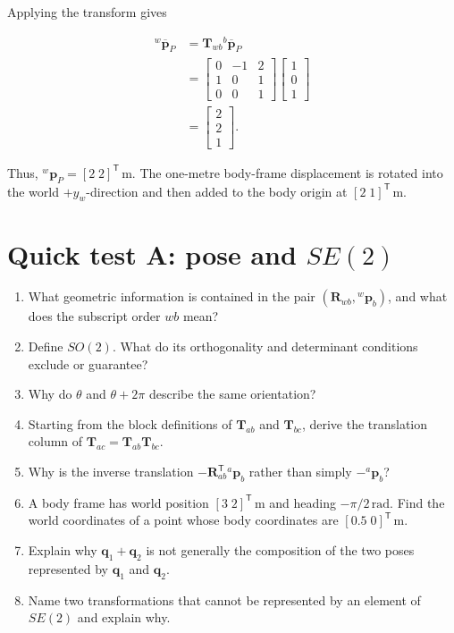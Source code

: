 \documentclass[
  australian,
  12pt,
  letterpaper,
  DIV=11,
  numbers=noendperiod,
  twoside]{scrreprt}
\providecommand{\tightlist}{%
  \setlength{\itemsep}{0pt}\setlength{\parskip}{0pt}}
\begin{document}
Applying the transform gives

\[
\begin{aligned}
{}^{w}\overline{\mathbf p}_P
&=
\mathbf T_{wb}{}^{b}\overline{\mathbf p}_P\\
&=
\begin{bmatrix}
0&-1&2\\
1&0&1\\
0&0&1
\end{bmatrix}
\begin{bmatrix}
1\\0\\1
\end{bmatrix}\\
&=
\begin{bmatrix}
2\\2\\1
\end{bmatrix}.
\end{aligned}
\]

Thus, \({}^{w}\mathbf p_P=[2\;2]^\mathsf T\,\mathrm m\). The one-metre
body-frame displacement is rotated into the world \(+y_w\)-direction and
then added to the body origin at \([2\;1]^\mathsf T\,\mathrm m\).

\section*{\texorpdfstring{Quick test A: pose and
\(SE(2)\)}{Quick test A: pose and SE(2)}}\label{quick-test-a-pose-and-se2}


\begin{enumerate}
\def\labelenumi{\arabic{enumi}.}
\tightlist
\item
  What geometric information is contained in the pair
  \((\mathbf R_{wb},{}^{w}\mathbf p_b)\), and what does the subscript
  order \(wb\) mean?
\item
  Define \(SO(2)\). What do its orthogonality and determinant conditions
  exclude or guarantee?
\item
  Why do \(\theta\) and \(\theta+2\pi\) describe the same orientation?
\item
  Starting from the block definitions of \(\mathbf T_{ab}\) and
  \(\mathbf T_{bc}\), derive the translation column of
  \(\mathbf T_{ac}=\mathbf T_{ab}\mathbf T_{bc}\).
\item
  Why is the inverse translation
  \(-\mathbf R_{ab}^\mathsf T{}^{a}\mathbf p_b\) rather than simply
  \(-{}^{a}\mathbf p_b\)?
\item
  A body frame has world position \([3\;2]^\mathsf T\,\mathrm m\) and
  heading \(-\pi/2\,\mathrm{rad}\). Find the world coordinates of a
  point whose body coordinates are \([0.5\;0]^\mathsf T\,\mathrm m\).
\item
  Explain why \(\mathbf q_1+\mathbf q_2\) is not generally the
  composition of the two poses represented by \(\mathbf q_1\) and
  \(\mathbf q_2\).
\item
  Name two transformations that cannot be represented by an element of
  \(SE(2)\) and explain why.
\end{enumerate}
\end{document}
